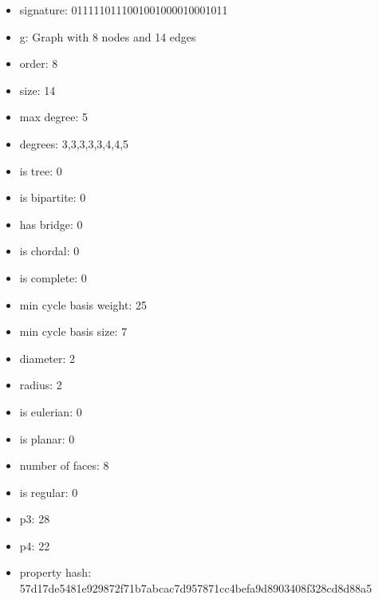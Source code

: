 \begin{itemize}
\item signature: 0111110111001001000010001011
\item g: Graph with 8 nodes and 14 edges
\item order: 8
\item size: 14
\item max degree: 5
\item degrees: 3,3,3,3,3,4,4,5
\item is tree: 0
\item is bipartite: 0
\item has bridge: 0
\item is chordal: 0
\item is complete: 0
\item min cycle basis weight: 25
\item min cycle basis size: 7
\item diameter: 2
\item radius: 2
\item is eulerian: 0
\item is planar: 0
\item number of faces: 8
\item is regular: 0
\item p3: 28
\item p4: 22
\item property hash: 57d17de5481e929872f71b7abcac7d957871cc4befa9d8903408f328cd8d88a5
\end{itemize}
\newpage
\begin{figure}
\end{figure}
